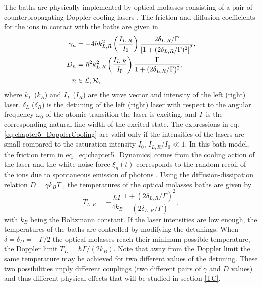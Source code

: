 The baths are physically implemented by optical molasses consisting of a pair of counterpropagating Doppler-cooling lasers \cite{Ruiz2014}. The friction and diffusion coefficients for the ions in contact with the baths are given in \cite{Cohen1992,Metcalf2003,Ruiz2014}
%
\begin{align}
  \gamma_n &= -4 \hbar k_{L,R}^2 \left(\frac{I_{L,R}}{I_0}\right)\frac{2\delta_{L,R}/\Gamma}{\left[1 + (2\delta_{L,R}/\Gamma)^2\right]^2},\nonumber\\
  D_n &= \hbar^2 k_{L,R}^2 \left(\frac{I_{L,R}}{I_0}\right) \frac{\Gamma}{1 + (2\delta_{L,R}/\Gamma)^2},\nonumber\\
  n &\in \cal{L},\cal{R},
  \label{eq:chapter5_DopplerCooling}
\end{align}
%
where $k_L$ ($k_R$) and $I_L$ ($I_R$) are the wave vector and intensity of the left (right) laser. $\delta_L$ ($\delta_R$) is the detuning of the left (right) laser with respect to the angular frequency $\omega_0$ of the atomic transition the laser is exciting, and $\Gamma$ is the corresponding natural line width of the  excited state. The expressions in eq. \eqref{eq:chapter5_DopplerCooling} are valid only if the intensities of the lasers are small compared to the saturation intensity $I_0$, $I_{L,R}/I_0\ll 1$. In this bath model, the friction term in eq. \eqref{eq:chapter5_Dynamics} comes from the cooling action of the laser and the white noise force $\xi_n(t)$ corresponds to the random recoil of the ions due to spontaneous emission of photons \cite{Metcalf2003,Cohen1992}. Using the diffusion-dissipation relation $D = \gamma k_B T $ \cite{Chee2010}, the temperatures of the optical molasses baths are given by
%
\begin{equation}
    T_{L,R} = -\frac{\hbar \Gamma}{4 k_B} \frac{1+(2\delta_{L,R}/\Gamma)^2}{(2\delta_{L,R}/\Gamma)},
    \label{eq:chapter5_Doppler}
\end{equation}
%
with $k_B$ being the Boltzmann constant. If the laser intensities are low enough, the temperatures of the baths are controlled by modifying the detunings. When $\delta = \delta_D=-\Gamma / 2$ the optical molasses reach their minimum possible temperature, the Doppler limit $T_{D} = {\hbar \Gamma}/({2k_B})$. Note that away from the Doppler limit the same temperature may be achieved
for two different values of the detuning. These two possibilities imply different couplings (two different pairs of $\gamma$ and $D$ values) and thus different physical effects that will be studied in section \ref{TC}.
%
%
%
%
